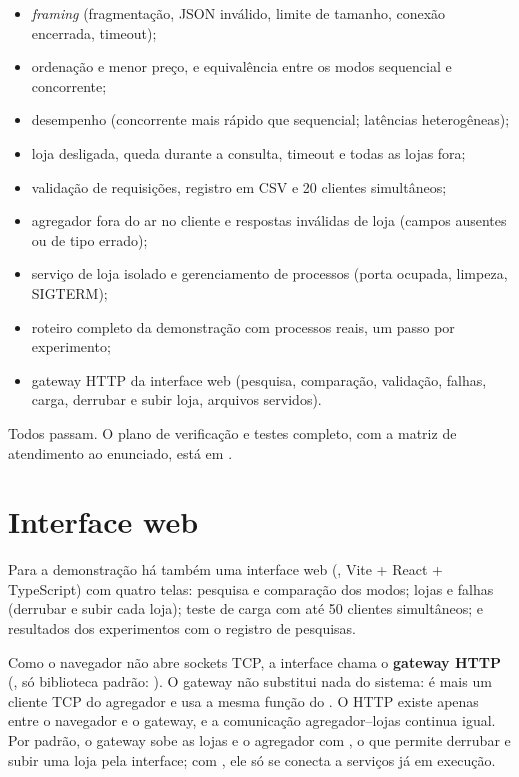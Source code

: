 \begin{itemize}
  \item \textit{framing} (fragmentação, JSON inválido, limite de tamanho, conexão encerrada, timeout);
  \item ordenação e menor preço, e equivalência entre os modos sequencial e concorrente;
  \item desempenho (concorrente mais rápido que sequencial; latências heterogêneas);
  \item loja desligada, queda durante a consulta, timeout e todas as lojas fora;
  \item validação de requisições, registro em CSV e 20 clientes simultâneos;
  \item agregador fora do ar no cliente e respostas inválidas de loja (campos ausentes ou de tipo errado);
  \item serviço de loja isolado e gerenciamento de processos (porta ocupada, limpeza, SIGTERM);
  \item roteiro completo da demonstração com processos reais, um passo por experimento;
  \item gateway HTTP da interface web (pesquisa, comparação, validação, falhas, carga, derrubar e subir loja, arquivos servidos).
\end{itemize}

Todos passam. O plano de verificação e testes completo, com a matriz de atendimento ao enunciado, está em .

\section{Interface web}\label{sec:interface-web}

Para a demonstração há também uma interface web (, Vite + React + TypeScript) com quatro telas: pesquisa e comparação dos modos; lojas e falhas (derrubar e subir cada loja); teste de carga com até 50 clientes simultâneos; e resultados dos experimentos com o registro de pesquisas.

Como o navegador não abre sockets TCP, a interface chama o \textbf{gateway HTTP} (, só biblioteca padrão: ). O gateway não substitui nada do sistema: é mais um cliente TCP do agregador e usa a mesma função do . O HTTP existe apenas entre o navegador e o gateway, e a comunicação agregador--lojas continua igual. Por padrão, o gateway sobe as lojas e o agregador com , o que permite derrubar e subir uma loja pela interface; com , ele só se conecta a serviços já em execução.

